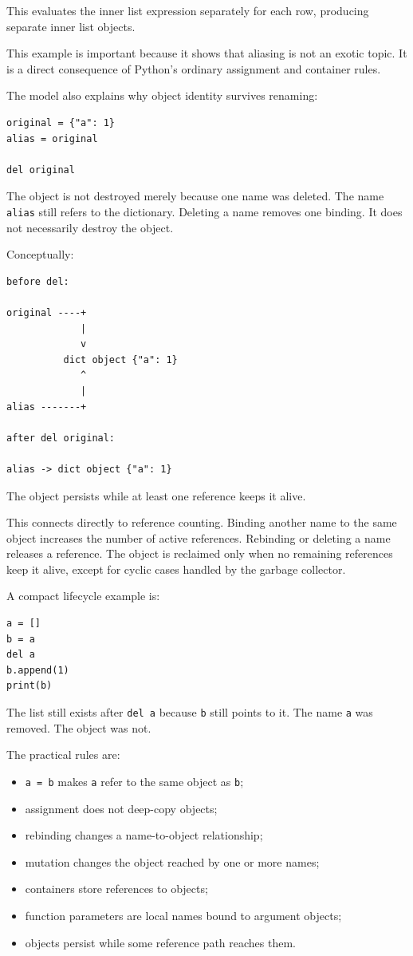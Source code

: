 This evaluates the inner list expression separately for each row, producing separate inner list objects.

This example is important because it shows that aliasing is not an exotic topic. It is a direct consequence of Python's ordinary assignment and container rules.

The model also explains why object identity survives renaming:

\begin{verbatim}
original = {"a": 1}
alias = original

del original
\end{verbatim}

The object is not destroyed merely because one name was deleted. The name \texttt{alias} still refers to the dictionary. Deleting a name removes one binding. It does not necessarily destroy the object.

Conceptually:

\begin{verbatim}
before del:

original ----+
             |
             v
          dict object {"a": 1}
             ^
             |
alias -------+

after del original:

alias -> dict object {"a": 1}
\end{verbatim}

The object persists while at least one reference keeps it alive.

This connects directly to reference counting. Binding another name to the same object increases the number of active references. Rebinding or deleting a name releases a reference. The object is reclaimed only when no remaining references keep it alive, except for cyclic cases handled by the garbage collector.

A compact lifecycle example is:

\begin{verbatim}
a = []
b = a
del a
b.append(1)
print(b)
\end{verbatim}

The list still exists after \texttt{del a} because \texttt{b} still points to it. The name \texttt{a} was removed. The object was not.

The practical rules are:

\begin{itemize}
    \item \texttt{a = b} makes \texttt{a} refer to the same object as \texttt{b};
    \item assignment does not deep-copy objects;
    \item rebinding changes a name-to-object relationship;
    \item mutation changes the object reached by one or more names;
    \item containers store references to objects;
    \item function parameters are local names bound to argument objects;
    \item objects persist while some reference path reaches them.
\end{itemize}

